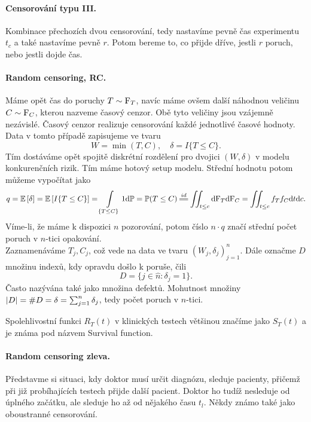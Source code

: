     \paragraph{Censorování typu III.}
    
    Kombinace přechozích dvou censorování, tedy nastavíme pevně čas experimentu $t_c$ a také nastavíme pevně $r$. Potom bereme to, co přijde dříve, jestli $r$ poruch, nebo jestli dojde čas.
    
    \paragraph{Random censoring, RC.}
    Máme opět čas do poruchy $T\sim\mathrm{F}_T$, navíc máme ovšem další náhodnou veličinu $C\sim\mathrm{F}_C$, kterou nazveme časový cenzor. Obě tyto veličiny jsou vzájemně nezávislé. Časový cenzor realizuje censorování každé jednotlivé časové hodnoty. Data v tomto případě zapisujeme ve tvaru
    $$W = \min(T,C), \quad \delta = I\lbrace T \leq C \rbrace. $$
    Tím dostáváme opět spojitě diskrétní rozdělení pro dvojici
    $(W,\delta)$ v modelu konkurenčních rizik. Tím máme hotový setup modelu. Střední hodnotu potom můžeme vypočítat jako
    $$q = \EE{\delta} =  \EE{I\lbrace T \leq C \rbrace} = \int\limits_{\lbrace T \leq C \rbrace}1\d\PP = \PP(T\leq C)\equal{id} \iint_{t\leq c}\d\FF_T\d\FF_C = \iint_{t\leq c}f_Tf_C  \d t \d c.$$
    Víme-li, že máme k dispozici $n$ pozorování, potom číslo $n\cdot q$ značí střední počet poruch v $n$-tici opakování. \\
    Zaznamenáváme $T_j, C_j$, což vede na data ve tvaru $(W_j,\delta_j)_{j=1}^n$. Dále označme $D$ množinu indexů, kdy opravdu došlo k poruše, čili $$D = \lbrace j\in \widehat{n}: \delta_j =1 \rbrace .$$ Často nazývána také jako množina defektů. Mohutnost množiny $\left|D\right| = \# D = \delta = \sum_{j=1}^n\delta_j$, tedy počet poruch v $n$-tici. 
    
    \begin{remark}
        Spolehlivostní funkci $R_T(t)$ v klinických testech většinou značíme jako $S_T(t)$ a je známa pod názvem Survival function. 	
    \end{remark} 
    
    \paragraph{Random censoring zleva.}
    Představme si situaci, kdy doktor musí určit diagnózu, sleduje pacienty, přičemž při již probíhajících testech přijde další pacient. Doktor ho tudíž nesleduje od úplného začátku, ale sleduje ho až od nějakého času $t_{l}$. Někdy známo také jako oboustranné censorování.
    
